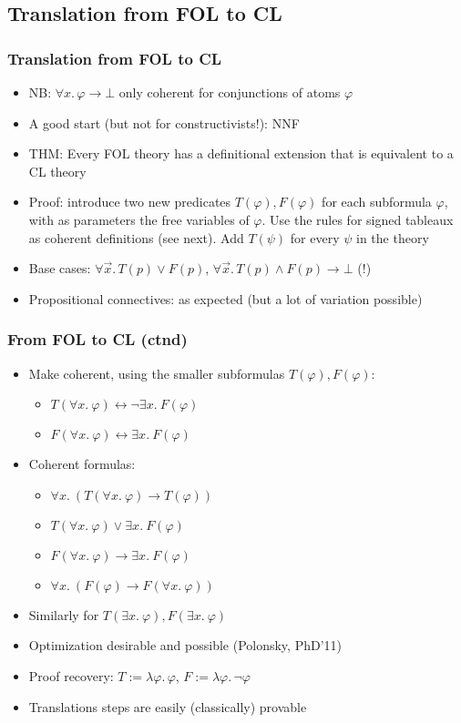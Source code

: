 \documentclass[handout,11pt]{beamer}
\newcommand{\imp}{\rightarrow}
\newcommand{\liff}{\leftrightarrow}
\begin{document}
\subsection{Translation from FOL to CL}

\begin{frame}
\frametitle{Translation from FOL to CL}
 \begin{itemize}[<+->]
   \item NB: $\forall x.\,\varphi \to\bot$ only coherent for \alert{conjunctions of atoms} $\varphi$
   \item A good start (but not for constructivists!): NNF
   \item THM: Every FOL theory has a definitional extension that is equivalent to a CL theory
   \item Proof: introduce two new predicates $T(\varphi),F(\varphi)$ for each subformula $\varphi$, with as parameters the free variables of $\varphi$.
 Use the rules for signed tableaux as coherent definitions (see next).
Add $T(\psi)$ for every $\psi$ in the theory
 \item Base cases: $\forall\vec x.\,T(p) \lor F(p)$, $\forall\vec x.\,T(p) \land F(p) \imp \bot$
(\alert{!})
\item Propositional connectives: as expected (but a lot of variation possible)
 \end{itemize}
\end{frame}
 

\begin{frame}
\frametitle{From FOL to CL (ctnd)}
 \begin{itemize}[<+->]
\item Make coherent, using the smaller subformulas $T(\varphi),F(\varphi)$:
 \begin{itemize}
 \item $T(\forall x.~\varphi) \liff \neg\exists x.~F(\varphi)$
 \item $F(\forall x.~\varphi) \liff \exists x.~F(\varphi)$
 \end{itemize}
\item Coherent formulas:
 \begin{itemize}
 \item $\forall x.~(T(\forall x.~\varphi) \to T(\varphi))$
 \item $T(\forall x.~\varphi) \lor \exists x.~F(\varphi)$
 \item $F(\forall x.~\varphi) \to \exists x.~F(\varphi)$
 \item $\forall x.~(F(\varphi) \to F(\forall x.~\varphi))$
 \end{itemize}
\item Similarly for $T(\exists x.~\varphi),F(\exists x.~\varphi)$
\item Optimization desirable and possible (Polonsky, PhD'11)
\item Proof recovery: $T:= \lambda\varphi.\,\varphi$, $F:= \lambda\varphi.\,\neg\varphi$
\item Translations steps are easily (classically) provable
\end{itemize}
\end{frame}
 
\end{document}
